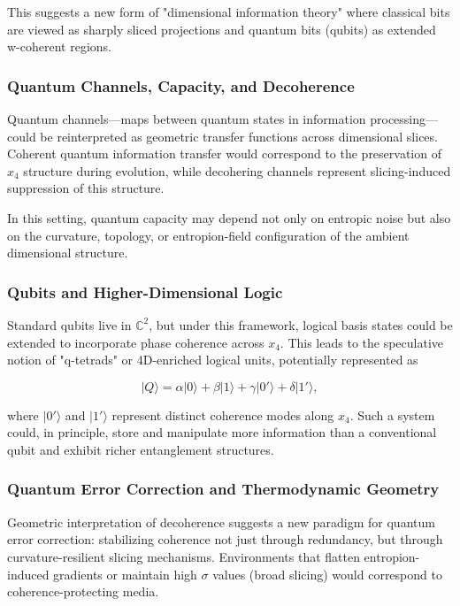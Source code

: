 \documentclass[12pt]{article}
\begin{document}
This suggests a new form of "dimensional information theory" where classical bits are viewed as sharply sliced projections and quantum bits (qubits) as extended w-coherent regions.

\subsubsection*{Quantum Channels, Capacity, and Decoherence}

Quantum channels—maps between quantum states in information processing—could be reinterpreted as geometric transfer functions across dimensional slices. Coherent quantum information transfer would correspond to the preservation of $x_4$ structure during evolution, while decohering channels represent slicing-induced suppression of this structure.

In this setting, quantum capacity may depend not only on entropic noise but also on the curvature, topology, or entropion-field configuration of the ambient dimensional structure.

\subsubsection*{Qubits and Higher-Dimensional Logic}

Standard qubits live in $\mathbb{C}^2$, but under this framework, logical basis states could be extended to incorporate phase coherence across $x_4$. This leads to the speculative notion of "q-tetrads" or 4D-enriched logical units, potentially represented as

\begin{equation}
|Q\rangle = \alpha |0\rangle + \beta |1\rangle + \gamma |0'\rangle + \delta |1'\rangle,
\end{equation}

where $|0'\rangle$ and $|1'\rangle$ represent distinct coherence modes along $x_4$. Such a system could, in principle, store and manipulate more information than a conventional qubit and exhibit richer entanglement structures.

\subsubsection*{Quantum Error Correction and Thermodynamic Geometry}

Geometric interpretation of decoherence suggests a new paradigm for quantum error correction: stabilizing coherence not just through redundancy, but through curvature-resilient slicing mechanisms. Environments that flatten entropion-induced gradients or maintain high $\sigma$ values (broad slicing) would correspond to coherence-protecting media.
\end{document}
